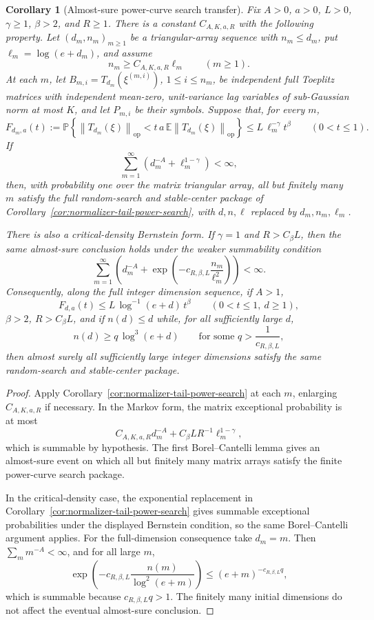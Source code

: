\documentclass[11pt]{amsart}
\numberwithin{equation}{section}
\newtheorem{corollary}[theorem]{Corollary}
\theoremstyle{definition}
\theoremstyle{remark}
\newcommand{\op}{\mathrm{op}}
\newcommand{\Prob}{\mathbb P}
\newcommand{\Exp}{\mathbb E}
\newcommand{\norm}[1]{\left\lVert #1\right\rVert}
\begin{document}
\begin{corollary}[Almost-sure power-curve search transfer]
\label{cor:normalizer-tail-power-borel-search}
Fix \(A>0\), \(a>0\), \(L>0\), \(\gamma\ge1\), \(\beta>2\), and \(R\ge1\).
There is a constant \(C_{A,K,a,R}\) with the following property.  Let
\((d_m,n_m)_{m\ge1}\) be a triangular-array sequence with \(n_m\le d_m\), put
\(\ell_m=\log(e+d_m)\), and assume
\[
  n_m\ge C_{A,K,a,R}\ell_m \qquad(m\ge1).
\]
At each \(m\), let \(B_{m,i}=T_{d_m}(\xi^{(m,i)})\), \(1\le i\le n_m\), be
independent full Toeplitz matrices with independent mean-zero, unit-variance
lag variables of sub-Gaussian norm at most \(K\), and let \(P_{m,i}\) be their
symbols.  Suppose that, for every \(m\),
\[
  F_{d_m,a}(t):=
  \Prob\left\{\norm{T_{d_m}(\xi)}_{\op}
  <t\,a\,\Exp\norm{T_{d_m}(\xi)}_{\op}\right\}
  \le L\,\ell_m^{-\gamma}t^\beta
  \qquad(0<t\le1).
\]
If
\[
  \sum_{m=1}^{\infty}
  \left(d_m^{-A}+\ell_m^{1-\gamma}\right)<\infty,
\]
then, with probability one over the matrix triangular array, all but finitely
many \(m\) satisfy the full random-search and stable-center package of
Corollary~\ref{cor:normalizer-tail-power-search}, with
\(d,n,\ell\) replaced by \(d_m,n_m,\ell_m\).

There is also a critical-density Bernstein form.  If \(\gamma=1\) and
\(R>C_\beta L\), then the same almost-sure conclusion holds under the weaker
summability condition
\[
  \sum_{m=1}^{\infty}
  \left(d_m^{-A}
  +\exp\left(-c_{R,\beta,L}\frac{n_m}{\ell_m^2}\right)\right)<\infty .
\]
Consequently, along the full integer dimension sequence, if \(A>1\),
\[
  F_{d,a}(t)\le L\,\log^{-1}(e+d)\,t^\beta
  \qquad(0<t\le1,\ d\ge1),
\]
\(\beta>2\), \(R>C_\beta L\), and if \(n(d)\le d\) while, for all sufficiently
large \(d\),
\[
  n(d)\ge q\,\log^3(e+d)
  \qquad\text{for some } q>\frac1{c_{R,\beta,L}},
\]
then almost surely all sufficiently large integer dimensions satisfy the same
random-search and stable-center package.
\end{corollary}

\begin{proof}
Apply Corollary~\ref{cor:normalizer-tail-power-search} at each \(m\), enlarging
\(C_{A,K,a,R}\) if necessary.  In the Markov form, the matrix exceptional
probability is at most
\[
  C_{A,K,a,R}d_m^{-A}+C_{\beta}L R^{-1}\ell_m^{1-\gamma},
\]
which is summable by hypothesis.  The first Borel--Cantelli lemma gives an
almost-sure event on which all but finitely many matrix arrays satisfy the
finite power-curve search package.

In the critical-density case, the exponential replacement in
Corollary~\ref{cor:normalizer-tail-power-search} gives summable exceptional
probabilities under the displayed Bernstein condition, so the same
Borel--Cantelli argument applies.  For the full-dimension consequence take
\(d_m=m\).  Then \(\sum_m m^{-A}<\infty\), and for all large \(m\),
\[
  \exp\left(-c_{R,\beta,L}\frac{n(m)}{\log^2(e+m)}\right)
  \le (e+m)^{-c_{R,\beta,L}q},
\]
which is summable because \(c_{R,\beta,L}q>1\).  The finitely many initial
dimensions do not affect the eventual almost-sure conclusion.
\end{proof}
\end{document}
